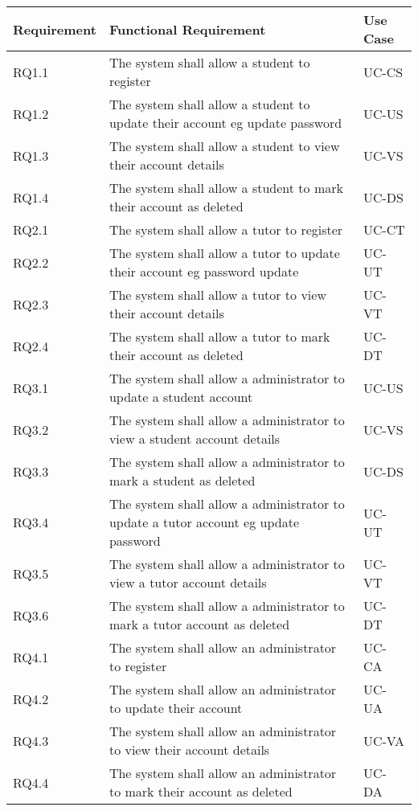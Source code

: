 \documentclass[12pt]{article}
\begin{document}
{
\centering
\begin{longtable}{| l | p{10cm}| l |}
			\hline			
			\textbf{Requirement} & \textbf{Functional Requirement} & \textbf{Use Case}
			
			\\ \hline RQ1.1 & The system shall allow a student to register  & UC-CS \\ \hline 
			RQ1.2 & The system shall allow a student to update their account eg update password& UC-US \\ \hline  
			RQ1.3 & The system shall allow a student to view their account details  & UC-VS \\ \hline 
			RQ1.4 & The system shall allow a student to mark their account as deleted & UC-DS  \\ \hline 
			
			
			RQ2.1 & The system shall allow a tutor to register & UC-CT \\ \hline
			RQ2.2 & The system shall allow a tutor to update their account eg password update & UC-UT \\ \hline
			RQ2.3 & The system shall allow a tutor to view their account details & UC-VT \\ \hline
			RQ2.4 & The system shall allow a tutor to mark their account as deleted & UC-DT \\ \hline  
						
			RQ3.1 & The system shall allow a administrator to update a student account & UC-US \\ \hline  
			RQ3.2 & The system shall allow a administrator to view a student account details  & UC-VS \\ \hline 
			RQ3.3 & The system shall allow a administrator to mark a student as deleted & UC-DS  \\ \hline 
			RQ3.4 & The system shall allow a administrator to update a tutor account eg update password & UC-UT \\ \hline
			RQ3.5 & The system shall allow a administrator to view a tutor account details & UC-VT \\ \hline
			RQ3.6 & The system shall allow a administrator to mark a tutor account as deleted & UC-DT \\ \hline
			 \hline	
			
			RQ4.1 & The system shall allow an administrator to register  & UC-CA \\ \hline 
			RQ4.2 & The system shall allow an administrator to update their account & UC-UA \\ \hline  
			RQ4.3 & The system shall allow an administrator to view their account details  & UC-VA \\ \hline 
			RQ4.4 & The system shall allow an administrator to mark their account as deleted & UC-DA  \\ \hline 


\end{longtable}}
\end{document}
